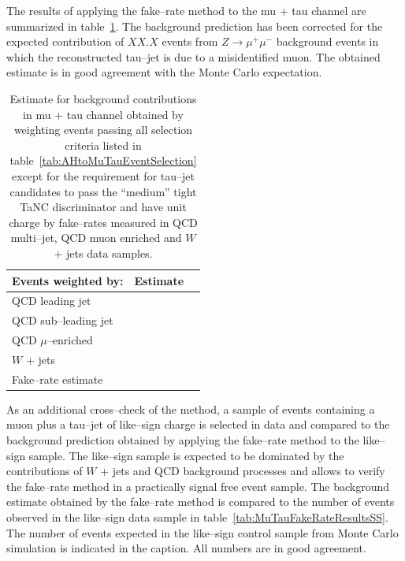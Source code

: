 The results of applying the fake--rate method to the mu + tau channel are
summarized in table~\ref{tab:MuTauFakeRateResultsOS}.  The background prediction
has been corrected for the expected contribution of $XX.X$ events from $Z \to
\mu^{+} \mu^{-}$ background events in which the reconstructed tau--jet is due to
a misidentified muon.  The obtained estimate is in good agreement with the Monte
Carlo expectation.

\begin{table}[t]
\begin{center}
\tablesize
\begin{tabular}{|l|c|c|}
\hline
Events weighted by: & Estimate \\
\hline
QCD leading jet       & \\
QCD sub--leading jet      & \\
QCD $\mu$--enriched & \\
$W$ + jets          & \\
\hline
Fake--rate estimate & \\
\hline
\end{tabular}
\end{center}
\begin{center}
\caption[Fake--rate method results]{Estimate for background contributions in mu +
tau channel obtained by weighting events passing all selection criteria listed
in table~\ref{tab:AHtoMuTauEventSelection} except for the requirement for
tau--jet candidates to pass the ``medium'' tight TaNC discriminator and have
unit charge by fake--rates measured in QCD multi--jet, QCD muon enriched and $W$
+ jets data samples.} \label{tab:MuTauFakeRateResultsOS}
\end{center}
\end{table}

As an additional cross--check of the method, a sample of events containing a
muon plus a tau--jet of like--sign charge is selected in data and compared to
the background prediction obtained by applying the fake--rate method to the
like--sign sample.  The like--sign sample is expected to be dominated by the
contributions of $W$ + jets and QCD background processes and allows to verify
the fake--rate method in a practically signal free event sample.  The background
estimate obtained by the fake--rate method is compared to the number of events
observed in the like--sign data sample in
table~\ref{tab:MuTauFakeRateResultsSS}.  The number of events expected in the
like--sign control sample from Monte Carlo simulation is indicated in the
caption.  All numbers are in good agreement.

